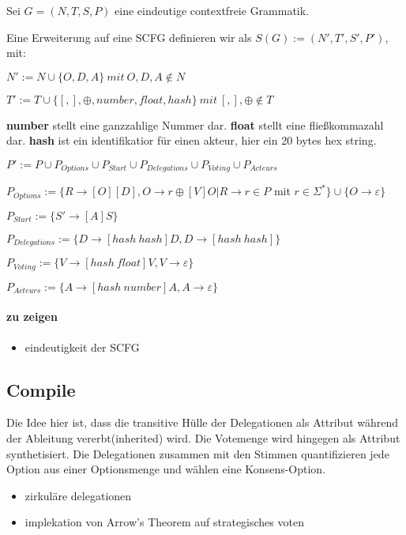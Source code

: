 \documentclass[]{article}
\begin{document}
Sei $G = (N,T,S,P)$ eine eindeutige contextfreie Grammatik.

Eine Erweiterung auf eine SCFG definieren wir als
$S(G) := (N',T',S',P')$, mit:

$N' := N \cup \{O,D,A\}\ mit\ O,D,A\notin N$

$T' := T \cup \{[ , ], \oplus, number, float, hash \}\ mit\ [,],\oplus \notin T$

\textbf{number} stellt eine ganzzahlige Nummer dar. \textbf{float}
stellt eine fließkommazahl dar. \textbf{hash} ist ein identifikatior für
einen akteur, hier ein 20 bytes hex string.

$P' := P\cup P_{Options} \cup P_{Start} \cup P_{Delegations} \cup P_{Voting} \cup P_{Acteurs}$

$P_{Options} := \{R \rightarrow [O][D], O \rightarrow r\oplus [V] O \vert R\rightarrow r\in P$
mit $r\in\Sigma^*\}\cup\{ O \rightarrow \varepsilon \}$

$P_{Start} := \{S'\rightarrow [A]S\}$

$P_{Delegations} := \{D\rightarrow [hash\ hash]D,D\rightarrow [hash\ hash]\}$

$P_{Voting} := \{V\rightarrow [hash\ float]V, V \rightarrow \varepsilon\}$

$P_{Acteurs} := \{A\rightarrow[hash\ number]A,A\rightarrow \varepsilon\}$

\paragraph{zu zeigen}

\begin{itemize}
\itemsep1pt\parskip0pt
\item
  eindeutigkeit der SCFG
\end{itemize}

\subsection{Compile}

Die Idee hier ist, dass die transitive Hülle der Delegationen als
Attribut während der Ableitung vererbt(inherited) wird. Die Votemenge
wird hingegen als Attribut synthetisiert. Die Delegationen zusammen mit
den Stimmen quantifizieren jede Option aus einer Optionsmenge und wählen
eine Konsens-Option.


\begin{itemize}
\itemsep1pt\parskip0pt
\item
  zirkuläre delegationen
\item
  implekation von Arrow's Theorem auf strategisches voten
\end{itemize}
\end{document}
